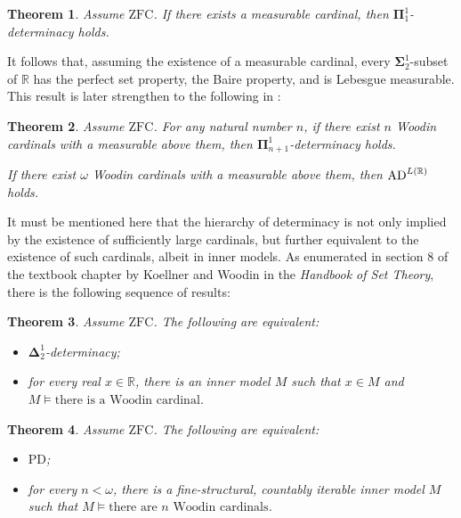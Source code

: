 \documentclass[12pt]{article}
\theoremstyle{plain}
\newtheorem{theorem}{Theorem}[section]
\theoremstyle{definition}
\newcommand{\ZFC}{\mathrm{ZFC}}
\newcommand{\PD}{\mathrm{PD}}
\newcommand{\AD}{\mathrm{AD}}
\begin{document}
\begin{theorem}
	Assume $\ZFC$. If there exists a measurable cardinal, then $\boldsymbol\Pi^1_1$-determinacy holds.
\end{theorem}

It follows that, assuming the existence of a measurable cardinal, every $\boldsymbol\Sigma^1_2$-subset of $\mathbb{R}$ has the perfect set property, the Baire property, and is Lebesgue measurable. This result is later strengthen to the following in \cite{woodin-cardinal-to-pd}:

\begin{theorem}
	Assume $\ZFC$. For any natural number $n$, if there exist $n$ Woodin cardinals with a measurable above them, then $\boldsymbol\Pi^1_{n + 1}$-determinacy holds.

	If there exist $\omega$ Woodin cardinals with a measurable above them, then $\AD^{L\mleft(\mathbb{R}\mright)}$ holds.
\end{theorem}

It must be mentioned here that the hierarchy of determinacy is not only implied by the existence of sufficiently large cardinals, but further equivalent to the existence of such cardinals, albeit in inner models. As enumerated in section 8 of the textbook chapter \cite{large-cardinals-from-determinacy} by Koellner and Woodin in the \emph{Handbook of Set Theory}, there is the following sequence of results:

\begin{theorem}
	\label{thm:delta-1-2-determinacy-equivalence}
	Assume $\ZFC$. The following are equivalent:
	\begin{itemize}
		\item $\boldsymbol\Delta^1_2$-determinacy;
		\item for every real $x \in \mathbb{R}$, there is an inner model $M$ such that $x \in M$ and $M \vDash \text{there is a Woodin cardinal}$.
	\end{itemize}
\end{theorem}

\begin{theorem}
	Assume $\ZFC$. The following are equivalent:
	\begin{itemize}
		\item $\PD$;
		\item for every $n < \omega$, there is a fine-structural, countably iterable inner
		      model $M$ such that $M \vDash \text{there are $n$ Woodin cardinals}$.
	\end{itemize}
\end{theorem}
\end{document}
